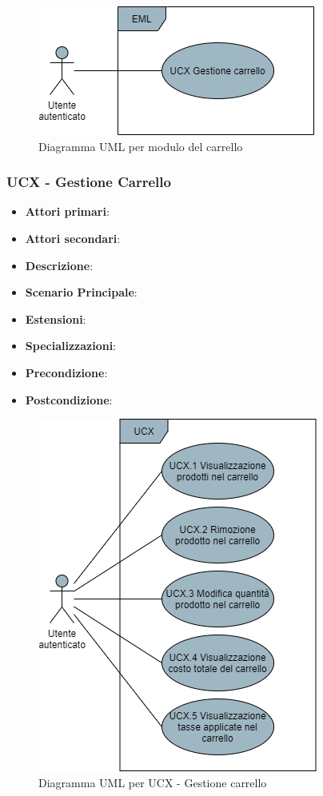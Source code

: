 \begin{figure}[H]
\centering
\includegraphics[scale=0.6]{res/UseCase/Immagini/CarrelloGenerale}
\caption{Diagramma UML per modulo del carrello}
\end{figure}

\subsubsection{UCX - Gestione Carrello}
\begin{itemize}
\item \textbf{Attori primari}:
\item \textbf{Attori secondari}:
\item \textbf{Descrizione}:
\item \textbf{Scenario Principale}:
\item \textbf{Estensioni}:
\item \textbf{Specializzazioni}:
\item \textbf{Precondizione}:
\item \textbf{Postcondizione}:
\end{itemize}

\begin{figure}[H]
\centering
\includegraphics[scale=0.6]{res/UseCase/Immagini/GestioneCarrello}
\caption{Diagramma UML per UCX - Gestione carrello}
\end{figure}

